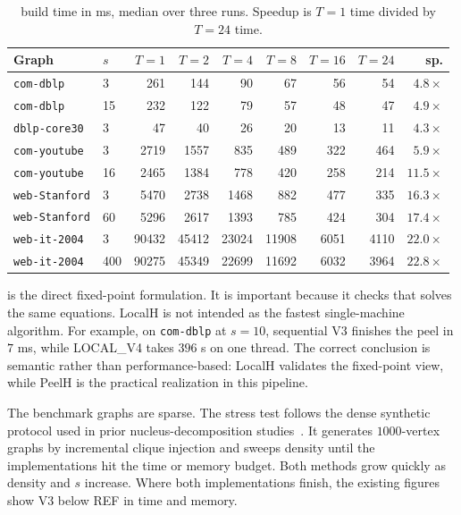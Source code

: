 \begin{table}[t]
\centering
\caption{\paraBuild{} build time in ms, median over three runs.
%
Speedup is \(T=1\) time divided by \(T=24\) time.}
\label{tab:par}
\tiny
\setlength{\tabcolsep}{2pt}
\begin{tabular}{@{}llrrrrrrr@{}}
\toprule
Graph & \(s\) & \(T=1\) & \(T=2\) & \(T=4\) & \(T=8\) & \(T=16\) & \(T=24\) & sp. \\
\midrule
\texttt{com-dblp}      & 3   & 261   & 144   & 90    & 67    & 56   & 54   & \(4.8\times\) \\
\texttt{com-dblp}      & 15  & 232   & 122   & 79    & 57    & 48   & 47   & \(4.9\times\) \\
\texttt{dblp-core30}   & 3   & 47    & 40    & 26    & 20    & 13   & 11   & \(4.3\times\) \\
\texttt{com-youtube}   & 3   & 2719  & 1557  & 835   & 489   & 322  & 464  & \(5.9\times\) \\
\texttt{com-youtube}   & 16  & 2465  & 1384  & 778   & 420   & 258  & 214  & \(11.5\times\) \\
\texttt{web-Stanford}  & 3   & 5470  & 2738  & 1468  & 882   & 477  & 335  & \(16.3\times\) \\
\texttt{web-Stanford}  & 60  & 5296  & 2617  & 1393  & 785   & 424  & 304  & \(17.4\times\) \\
\texttt{web-it-2004}   & 3   & 90432 & 45412 & 23024 & 11908 & 6051 & 4110 & \(22.0\times\) \\
\texttt{web-it-2004}   & 400 & 90275 & 45349 & 22699 & 11692 & 6032 & 3964 & \(22.8\times\) \\
\bottomrule
\end{tabular}
\end{table}

\localH{} is the direct fixed-point formulation.
%
It is important because it checks that \peelH{} solves the same equations.
%
LocalH is not intended as the fastest single-machine algorithm.
%
For example, on \texttt{com-dblp} at \(s=10\), sequential V3 finishes the peel in \(7\) ms, while LOCAL\_V4 takes \(396\) s on one thread.
%
The correct conclusion is semantic rather than performance-based: LocalH validates the fixed-point view, while PeelH is the practical realization in this pipeline.

The benchmark graphs are sparse.
%
The stress test follows the dense synthetic protocol used in prior nucleus-decomposition studies~\cite{nucleusSariyuceTODS,NuclearCD}.
%
It generates \(1000\)-vertex graphs by incremental clique injection and sweeps density until the implementations hit the time or memory budget.
%
Both methods grow quickly as density and \(s\) increase.
%
Where both implementations finish, the existing figures show V3 below REF in time and memory.
%

